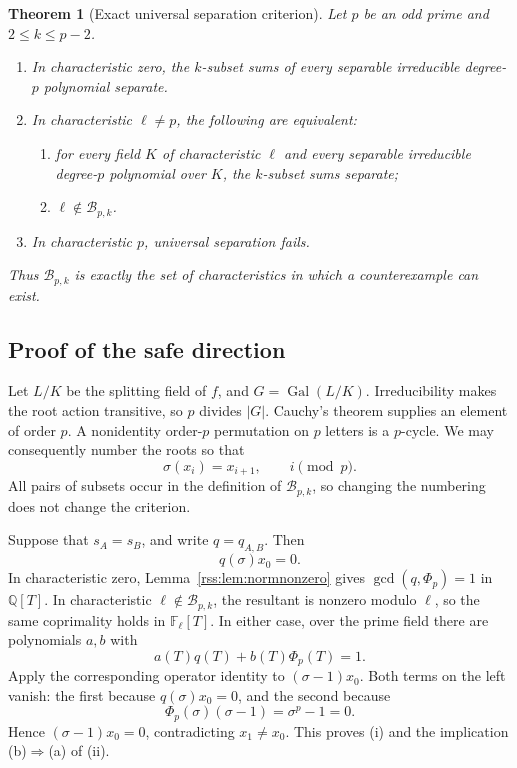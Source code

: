 \documentclass[11pt,a4paper]{article}
\newtheorem{theorem}{Theorem}[section]
\theoremstyle{definition}
\theoremstyle{remark}
\newcommand{\Q}{\mathbb Q}
\newcommand{\F}{\mathbb F}
\newcommand{\Gal}{\operatorname{Gal}}
\begin{document}
\begin{theorem}[Exact universal separation criterion]\label{rss:thm:bad}
Let $p$ be an odd prime and $2\leq k\leq p-2$.
\begin{enumerate}[label=(\roman*)]
\item In characteristic zero, the $k$-subset sums of every separable
irreducible degree-$p$ polynomial separate.
\item In characteristic $\ell\neq p$, the following are equivalent:
\begin{enumerate}[label=(\alph*)]
\item for every field $K$ of characteristic $\ell$ and every separable
irreducible degree-$p$ polynomial over $K$, the $k$-subset sums separate;
\item $\ell\notin\mathcal B_{p,k}$.
\end{enumerate}
\item In characteristic $p$, universal separation fails.
\end{enumerate}
Thus $\mathcal B_{p,k}$ is exactly the set of characteristics in which a
counterexample can exist.
\end{theorem}

\subsection{Proof of the safe direction}

Let $L/K$ be the splitting field of $f$, and $G=\Gal(L/K)$. Irreducibility
makes the root action transitive, so $p$ divides $|G|$. Cauchy's theorem
supplies an element of order $p$. A nonidentity order-$p$ permutation on
$p$ letters is a $p$-cycle. We may consequently number the roots so that
\[
 \sigma(x_i)=x_{i+1},\qquad i\pmod p.
\]
All pairs of subsets occur in the definition of $\mathcal B_{p,k}$, so
changing the numbering does not change the criterion.

Suppose that $s_A=s_B$, and write $q=q_{A,B}$. Then
\[
 q(\sigma)x_0=0.
\]
In characteristic zero, Lemma~\ref{rss:lem:normnonzero} gives
$\gcd(q,\Phi_p)=1$ in $\Q[T]$. In characteristic
$\ell\notin\mathcal B_{p,k}$, the resultant is nonzero modulo $\ell$, so
the same coprimality holds in $\F_\ell[T]$. In either case, over the prime
field there are polynomials $a,b$ with
\[
 a(T)q(T)+b(T)\Phi_p(T)=1.
\]
Apply the corresponding operator identity to $(\sigma-1)x_0$. Both terms
on the left vanish: the first because $q(\sigma)x_0=0$, and the second
because
\[
 \Phi_p(\sigma)(\sigma-1)=\sigma^p-1=0.
\]
Hence $(\sigma-1)x_0=0$, contradicting $x_1\neq x_0$. This proves (i) and
the implication (b)$\Rightarrow$(a) of (ii).
\end{document}

